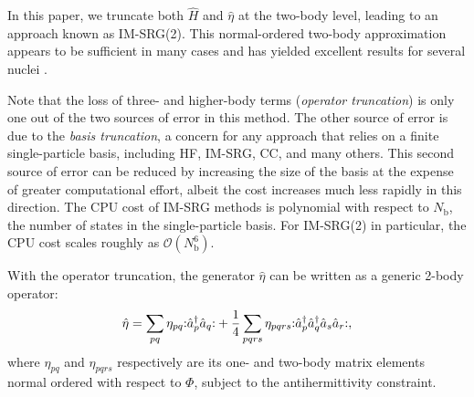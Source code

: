 In this paper, we truncate both $\hat{H}$ and $\hat{\eta}$ at the two-body level, leading to an approach known as IM-SRG(2).  This normal-ordered two-body approximation appears to be sufficient in many cases and has yielded excellent results for several nuclei \cite{PhysRevLett.106.222502,PhysRevLett.109.052501,IMSRG}.

Note that the loss of three- and higher-body terms (\textit{operator truncation}) is only one out of the two sources of error in this method.  The other source of error is due to the \textit{basis truncation}, a concern for any approach that relies on a finite single-particle basis, including HF, IM-SRG, CC, and many others.  This second source of error can be reduced by increasing the size of the basis at the expense of greater computational effort, albeit the cost increases much less rapidly in this direction.  The CPU cost of IM-SRG methods is polynomial with respect to $N_{\mathrm{b}}$, the number of states in the single-particle basis.  For IM-SRG(2) in particular, the CPU cost scales roughly as $\mathcal{O}(N_{\mathrm{b}}^6)$.

With the operator truncation, the generator $\hat{\eta}$ can be written as a generic 2-body operator:
\begin{align*}
\hat{\eta} = \sum_{p q} \eta_{p q} \mathopen: \hat a_p^\dagger \hat a_q \mathclose: +
\frac{1}{4} \sum_{p q r s}\eta_{p q r s} \mathopen: \hat a_p^\dagger \hat a_q^\dagger \hat a_s \hat a_r \mathclose:,
\end{align*}
where $\eta_{p q}$ and $ \eta_{p q r s}$ respectively are its one- and two-body matrix elements normal ordered with respect to $\Phi$, subject to the antihermittivity constraint.

